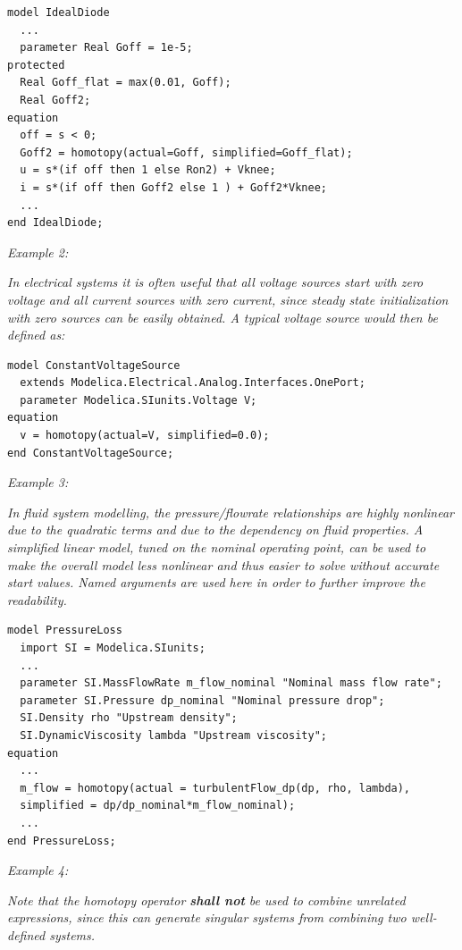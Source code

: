 \documentclass[10pt,a4paper]{report}
\begin{document}
\begin{lstlisting}[language=modelica]
model IdealDiode
  ...
  parameter Real Goff = 1e-5;
protected
  Real Goff_flat = max(0.01, Goff);
  Real Goff2;
equation
  off = s < 0;
  Goff2 = homotopy(actual=Goff, simplified=Goff_flat);
  u = s*(if off then 1 else Ron2) + Vknee;
  i = s*(if off then Goff2 else 1 ) + Goff2*Vknee;
  ...
end IdealDiode;
\end{lstlisting}

\emph{Example 2:}

\emph{In electrical systems it is often useful that all voltage sources
start with zero voltage and all current sources with zero current, since
steady state initialization with zero sources can be easily obtained. A
typical voltage source would then be defined as:}

\begin{lstlisting}[language=modelica]
model ConstantVoltageSource
  extends Modelica.Electrical.Analog.Interfaces.OnePort; 
  parameter Modelica.SIunits.Voltage V;
equation
  v = homotopy(actual=V, simplified=0.0);
end ConstantVoltageSource;
\end{lstlisting}

\emph{Example 3:}

\emph{In fluid system modelling, the pressure/flowrate relationships are
highly nonlinear due to the quadratic terms and due to the dependency on
fluid properties. A simplified linear model, tuned on the nominal
operating point, can be used to make the overall model less nonlinear
and thus easier to solve without accurate start values. Named arguments
are used here in order to further improve the readability.}

\begin{lstlisting}[language=modelica]
model PressureLoss
  import SI = Modelica.SIunits;
  ...
  parameter SI.MassFlowRate m_flow_nominal "Nominal mass flow rate";
  parameter SI.Pressure dp_nominal "Nominal pressure drop";
  SI.Density rho "Upstream density";
  SI.DynamicViscosity lambda "Upstream viscosity";
equation
  ...
  m_flow = homotopy(actual = turbulentFlow_dp(dp, rho, lambda),
  simplified = dp/dp_nominal*m_flow_nominal);
  ...
end PressureLoss;
\end{lstlisting}

\emph{Example 4:}

\emph{Note that the homotopy operator \textbf{shall not} be used to
combine unrelated expressions, since this can generate singular systems
from combining two well-defined systems.}
\end{document}
